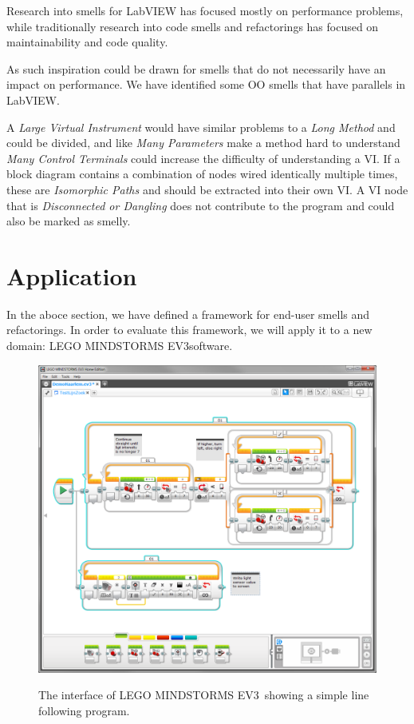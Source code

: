 \documentclass{sig-alternate}
\newcommand{\ms}{LEGO MINDSTORMS EV3}
\begin{document}
Research into smells for LabVIEW has focused mostly on performance problems, while traditionally research into code smells and refactorings has focused on maintainability and code quality.

As such inspiration could be drawn for smells that do not necessarily have an impact on performance.
We have identified some OO smells that have parallels in LabVIEW.

A \emph{Large Virtual Instrument} would have similar problems to a \emph{Long Method} and could be divided, and like \emph{Many Parameters} make a method hard to understand \emph{Many Control Terminals} could increase the difficulty of understanding a VI.
If a block diagram contains a combination of nodes wired identically multiple times, these are \emph{Isomorphic Paths} and should be extracted into their own VI. 
A VI node that is \emph{Disconnected or Dangling} does not contribute to the program and could also be marked as smelly. 


\section{Application}
In the aboce section, we have defined a framework for end-user smells and refactorings. In order to evaluate this framework, we will apply it to a new domain: \ms software. 

\begin{figure}
\caption{The interface of \ms~showing a simple line following program.}
\centering
\includegraphics[width=\columnwidth]{img/ms}
\label{fig:ms}
\end{figure}
\end{document}

